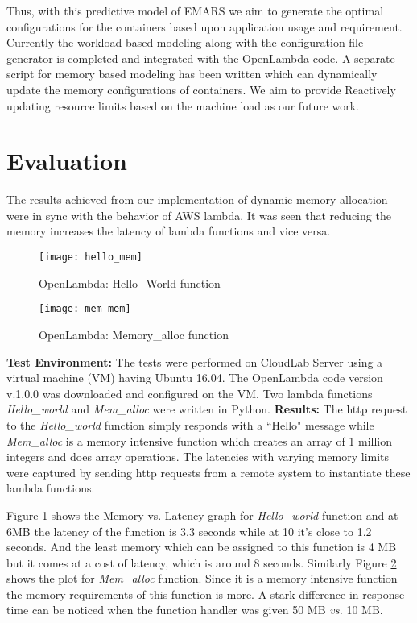 \documentclass[letterpaper,twocolumn,10pt]{article}
\begin{document}
Thus, with this predictive model of EMARS we aim to  generate the optimal configurations for the containers based upon application usage and requirement. Currently the workload based modeling along with the configuration file generator is completed and integrated with the OpenLambda code. A separate script for memory based modeling has been written which can dynamically update the memory configurations of containers. We aim to provide Reactively updating resource limits based on the machine load as our future work. 
\section{Evaluation}
\label{sec:third}

The results achieved from our implementation of dynamic memory allocation were in sync with the behavior of AWS lambda. It was seen that reducing the memory increases the latency of lambda functions and vice versa.

\begin{figure}[H]
\texttt{[image: hello\_mem]}
    \caption{OpenLambda: Hello\_World function}
    \label{fig:Figure8}
\end{figure}
\begin{figure}[H]
\texttt{[image: mem\_mem]}
    \caption{OpenLambda: Memory\_alloc function}
    \label{fig:Figure9}
\end{figure}
\textbf{Test Environment:} The tests were performed on CloudLab Server using a virtual machine (VM) having Ubuntu 16.04. The OpenLambda code version v.1.0.0 was downloaded and configured on the VM. Two lambda functions
\textit{Hello\_world} and \textit{Mem\_alloc} were written in Python.
\textbf{Results:} The http request to the \textit{Hello\_world} function simply responds with a ``Hello" message while \textit{Mem\_alloc} is a memory intensive function which creates an array of 1 million integers and does array operations. The latencies with varying memory limits were captured by sending http requests from a remote system to instantiate these lambda functions.

Figure \ref{fig:Figure8} shows the Memory vs. Latency graph for \textit{Hello\_world} function and at 6MB the latency of the function is 3.3 seconds while at 10 it's close to 1.2 seconds. And the least memory which can be assigned to this function is 4 MB but it comes at a cost of latency, which is around 8 seconds. Similarly Figure \ref{fig:Figure9} shows the plot for \textit{Mem\_alloc} function. Since it is a memory intensive function the memory requirements of this function is more. A stark difference in response time can be noticed when the function handler was given 50 MB \textit{vs.} 10 MB.
\end{document}
